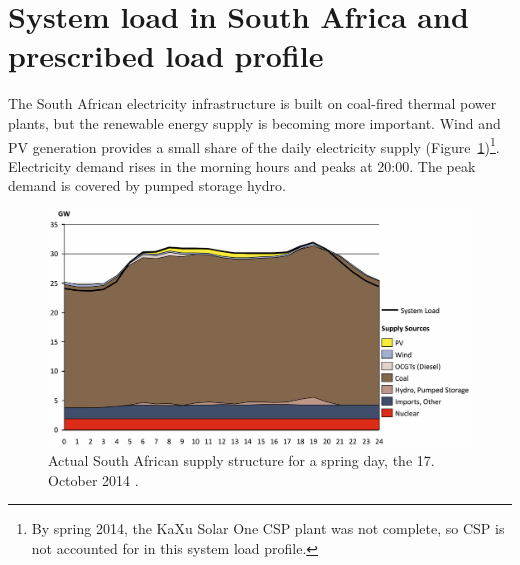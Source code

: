 \pagebreak
\section{System load in South Africa and prescribed load profile} \label{SystemloadinSA}

The South African electricity infrastructure is built on coal-fired thermal power plants, but the renewable energy supply is becoming more important. Wind and PV generation provides a small share of the daily electricity supply (Figure~\ref{systemload})\footnote{By spring 2014, the KaXu Solar One CSP plant was not complete, so CSP is not accounted for in this system load profile.}. Electricity demand rises in the morning hours and peaks at 20:00. The peak demand is covered by pumped storage hydro. 


\begin{figure}[htbp]  
\centering
\includegraphics[width=1\linewidth]{FIG/systemload}
\caption[Actual South African supply structure for a spring day, the 17. October 2014.]{Actual South African supply structure for a spring day, the 17. October 2014 \cite{CSIR2015}.}\label{systemload}
\end{figure}

